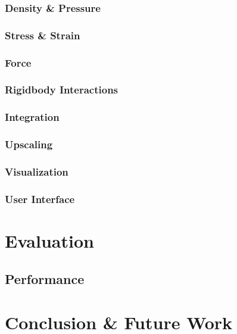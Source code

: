 \documentclass[intern]{cgMA}
\begin{document}
    \subsubsection{Density \& Pressure}
    
    \subsubsection{Stress \& Strain}
    
    \subsubsection{Force}
    
    \subsubsection{Rigidbody Interactions}
    
    \subsubsection{Integration}
    
    \subsubsection{Upscaling}
    
    \subsubsection{Visualization}
    
    \subsubsection{User Interface}
    
    \section{Evaluation}
    
    \subsection{Performance}
    
    \section{Conclusion \& Future Work}
    
    \newpage
    \printbibliography
\end{document}
